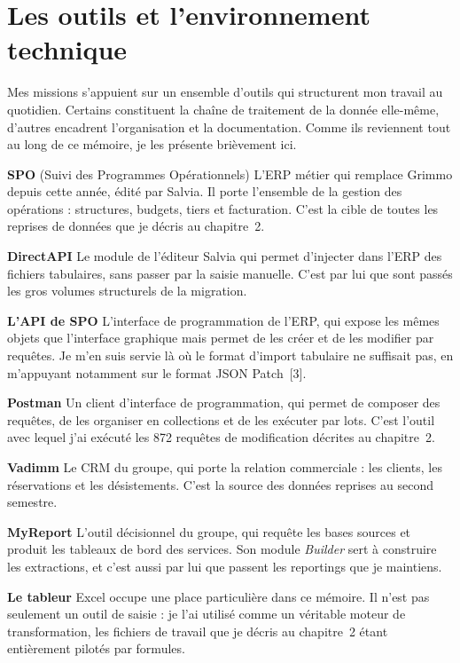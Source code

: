 \section{Les outils et l'environnement technique}

Mes missions s'appuient sur un ensemble d'outils qui structurent mon travail au quotidien.
Certains constituent la chaîne de traitement de la donnée elle-même, d'autres encadrent
l'organisation et la documentation. Comme ils reviennent tout au long de ce mémoire, je les
présente brièvement ici.

\textbf{SPO} (Suivi des Programmes Opérationnels) L'ERP métier qui remplace Grimmo depuis cette
année, édité par Salvia. Il porte l'ensemble de la gestion des opérations : structures,
budgets, tiers et facturation. C'est la cible de toutes les reprises de données que je décris
au chapitre~2.

\textbf{DirectAPI} Le module de l'éditeur Salvia qui permet d'injecter dans l'ERP des fichiers
tabulaires, sans passer par la saisie manuelle. C'est par lui que sont passés les gros volumes
structurels de la migration.

\textbf{L'API de SPO} L'interface de programmation de l'ERP, qui expose les mêmes objets que
l'interface graphique mais permet de les créer et de les modifier par requêtes. Je m'en suis
servie là où le format d'import tabulaire ne suffisait pas, en m'appuyant notamment sur le
format JSON Patch~[3].

\textbf{Postman} Un client d'interface de programmation, qui permet de composer des requêtes,
de les organiser en collections et de les exécuter par lots. C'est l'outil avec lequel j'ai
exécuté les 872 requêtes de modification décrites au chapitre~2.

\textbf{Vadimm} Le CRM du groupe, qui porte la relation commerciale : les clients, les
réservations et les désistements. C'est la source des données reprises au second semestre.

\textbf{MyReport} L'outil décisionnel du groupe, qui requête les bases sources et produit les
tableaux de bord des services. Son module \emph{Builder} sert à construire les extractions, et
c'est aussi par lui que passent les reportings que je maintiens.

\textbf{Le tableur} Excel occupe une place particulière dans ce mémoire. Il n'est pas seulement
un outil de saisie : je l'ai utilisé comme un véritable moteur de transformation, les fichiers
de travail que je décris au chapitre~2 étant entièrement pilotés par formules.


